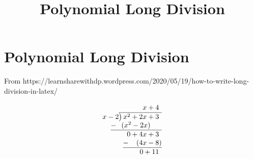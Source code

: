\documentclass{article}
\title{Polynomial Long Division}
\theoremstyle{definition}
\begin{document}
\maketitle

\section*{Polynomial Long Division}

From https://learnsharewithdp.wordpress.com/2020/05/19/how-to-write-long-division-in-latex/

\[
\begin{array}{r}
x+4\phantom{)}   \\
x-2{\overline{\smash{\big)}\,x^2+2x+3\phantom{)}}}\\
\underline{-~\phantom{(}(x^2-2x)\phantom{-b)}}\\
0+4x+3\phantom{)}\\ 
\underline{-~\phantom{()}(4x-8)}\\ 
0+11\phantom{)}
\end{array}
\]
\end{document}
